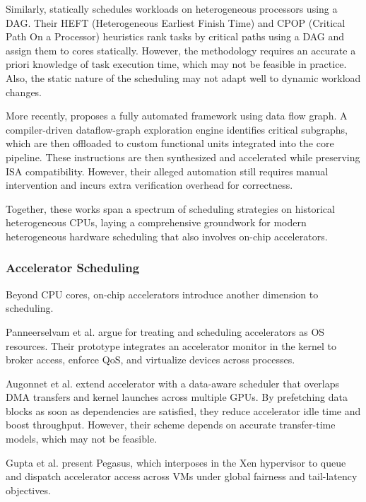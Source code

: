Similarly, \cite{topcuogluTaskScheduling1999} statically schedules workloads on heterogeneous processors using a DAG.
Their HEFT (Heterogeneous Earliest Finish Time) and CPOP (Critical Path On a Processor) heuristics rank tasks by critical paths using a DAG and assign them to cores statically.
However, the methodology requires an accurate a priori knowledge of task execution time, which may not be feasible in practice.
Also, the static nature of the scheduling may not adapt well to dynamic workload changes.

More recently, \cite{clarkProcessorAcceleration2003} proposes a fully automated framework using data flow graph.
A compiler-driven dataflow-graph exploration engine identifies critical subgraphs, which are then offloaded to custom functional units integrated into the core pipeline.
These instructions are then synthesized and accelerated while preserving ISA compatibility.
However, their alleged automation still requires manual intervention and incurs extra verification overhead for correctness.

Together, these works span a spectrum of scheduling strategies on historical heterogeneous CPUs, laying a comprehensive groundwork for modern heterogeneous hardware scheduling that also involves on-chip accelerators.

\subsubsection{Accelerator Scheduling}

Beyond CPU cores, on-chip accelerators introduce another dimension to scheduling.

Panneerselvam et al. \cite{panneerselvamOperatingSystems2012} argue for treating and scheduling accelerators as OS resources.
Their prototype integrates an accelerator monitor in the kernel to broker access, enforce QoS, and virtualize devices across processes.

Augonnet et al. \cite{augonnetDataAwareTask2010} extend accelerator with a data-aware scheduler that overlaps DMA transfers and kernel launches across multiple GPUs.
By prefetching data blocks as soon as dependencies are satisfied, they reduce accelerator idle time and boost throughput.
However, their scheme depends on accurate transfer-time models, which may not be feasible.

Gupta et al. \cite{guptaPegasusCoordinated2011} present Pegasus, which interposes in the Xen hypervisor to queue and dispatch accelerator access across VMs under global fairness and tail-latency objectives.

